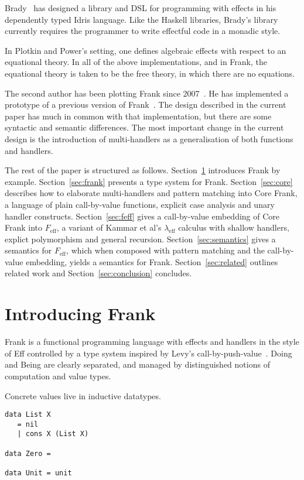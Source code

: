 \documentclass[preprint]{sigplanconf}
\newcommand{\lameff}{$\lambda_\mathrm{eff}$\xspace}
\newcommand{\feff}{$F_\textrm{eff}$\xspace}
\begin{document}
Brady~\cite{Brady13} has designed a library and DSL for programming
with effects in his dependently typed Idris language. Like the Haskell
libraries, Brady's library currently requires the programmer to write
effectful code in a monadic style.

In Plotkin and Power’s setting, one defines algebraic effects with
respect to an equational theory. In all of the above implementations,
and in Frank, the equational theory is taken to be the free theory, in
which there are no equations.

The second author has been plotting Frank since
2007~\cite{McBride07}. He has implemented a prototype of a previous
version of Frank~\cite{McBride12}. The design described in the current
paper has much in common with that implementation, but there are some
syntactic and semantic differences. The most important change in the
current design is the introduction of multi-handlers as a
generalisation of both functions and handlers.

The rest of the paper is structured as follows.
%
Section~\ref{sec:examples} introduces Frank by
example. Section~\ref{sec:frank} presents a type system for
Frank. Section~\ref{sec:core} describes how to elaborate
multi-handlers and pattern matching into Core Frank, a language of
plain call-by-value functions, explicit case analysis and unary
handler constructs. Section~\ref{sec:feff} gives a call-by-value
embedding of Core Frank into \feff, a variant of Kammar et al's
\lameff calculus with shallow handlers, explict polymorphism and
general recursion. Section~\ref{sec:semantics} gives a semantics for
\feff, which when composed with pattern matching and the call-by-value
embedding, yields a semantics for Frank. Section~\ref{sec:related}
outlines related work and Section~\ref{sec:conclusion} concludes.

\section{Introducing Frank}
\label{sec:examples}

Frank is a functional programming language with effects and handlers
in the style of Eff controlled by a type system inspired by Levy's
call-by-push-value~\cite{Levy2004}.
%
Doing and Being are clearly separated, and managed by distinguished
notions of computation and value types.

Concrete values live in inductive datatypes.
%
\begin{verbatim}
data List X
   = nil
   | cons X (List X)

data Zero =

data Unit = unit
\end{verbatim}
\end{document}
